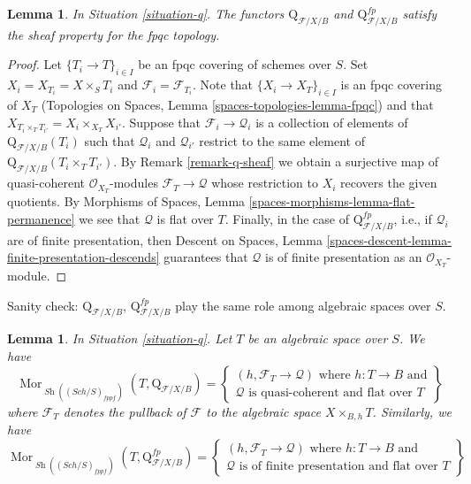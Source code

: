 \documentclass{stacks-project}
\theoremstyle{plain}
\newtheorem{lemma}[subsection]{Lemma}
\theoremstyle{definition}
\theoremstyle{remark}
\numberwithin{equation}{subsection}
\def\Sch{\mathit{Sch}}
\def\Mor{\mathop{\mathrm{Mor}}\nolimits}
\def\Sh{\mathop{\mathit{Sh}}\nolimits}
\begin{document}
\begin{lemma}
\label{lemma-q-sheaf}
In Situation \ref{situation-q}. The functors
$\text{Q}_{\mathcal{F}/X/B}$ and
$\text{Q}^{fp}_{\mathcal{F}/X/B}$
satisfy the sheaf property for the fpqc topology.
\end{lemma}

\begin{proof}
Let $\{T_i \to T\}_{i \in I}$ be an fpqc covering of schemes over $S$.
Set $X_i = X_{T_i} = X \times_S T_i$ and $\mathcal{F}_i = \mathcal{F}_{T_i}$.
Note that $\{X_i \to X_T\}_{i \in I}$ is an fpqc covering of
$X_T$ (Topologies on Spaces, Lemma \ref{spaces-topologies-lemma-fpqc})
and that $X_{T_i \times_T T_{i'}} = X_i \times_{X_T} X_{i'}$.
Suppose that $\mathcal{F}_i \to \mathcal{Q}_i$ is a collection of
elements of $\text{Q}_{\mathcal{F}/X/B}(T_i)$ such that $\mathcal{Q}_i$
and $\mathcal{Q}_{i'}$ restrict to the same element of
$\text{Q}_{\mathcal{F}/X/B}(T_i \times_T T_{i'})$. By
Remark \ref{remark-q-sheaf}
we obtain a surjective map of quasi-coherent $\mathcal{O}_{X_T}$-modules
$\mathcal{F}_T \to \mathcal{Q}$ whose restriction to $X_i$ recovers
the given quotients.
By Morphisms of Spaces, Lemma \ref{spaces-morphisms-lemma-flat-permanence}
we see that $\mathcal{Q}$ is flat over $T$. Finally, in the case of
$\text{Q}^{fp}_{\mathcal{F}/X/B}$, i.e., if $\mathcal{Q}_i$ are
of finite presentation, then
Descent on Spaces, Lemma
\ref{spaces-descent-lemma-finite-presentation-descends}
guarantees that $\mathcal{Q}$ is of finite presentation as an
$\mathcal{O}_{X_T}$-module.
\end{proof}

\noindent
Sanity check: $\text{Q}_{\mathcal{F}/X/B}$,
$\text{Q}^{fp}_{\mathcal{F}/X/B}$
play the same role among algebraic spaces
over $S$.

\begin{lemma}
\label{lemma-extend-q-to-spaces}
In Situation \ref{situation-q}. Let $T$ be an algebraic space over $S$.
We have
$$
\Mor_{\Sh((\Sch/S)_{fppf})}(T,  \text{Q}_{\mathcal{F}/X/B}) =
\left\{
\begin{matrix}
(h, \mathcal{F}_T \to \mathcal{Q}) \text{ where }
h : T \to B \text{ and}\\
\mathcal{Q}\text{ is quasi-coherent and flat over }T
\end{matrix}
\right\}
$$
where $\mathcal{F}_T$ denotes the pullback of $\mathcal{F}$
to the algebraic space $X \times_{B, h} T$. Similarly, we have
$$
\Mor_{\Sh((\Sch/S)_{fppf})}(T,  \text{Q}^{fp}_{\mathcal{F}/X/B}) =
\left\{
\begin{matrix}
(h, \mathcal{F}_T \to \mathcal{Q}) \text{ where }
h : T \to B \text{ and}\\
\mathcal{Q}\text{ is of finite presentation and flat over }T
\end{matrix}
\right\}
$$
\end{lemma}
\end{document}
